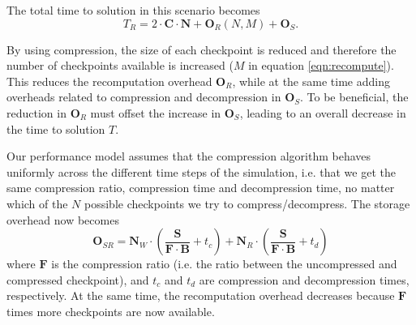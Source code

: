 \documentclass[conference]{IEEEtran}
\begin{document}
The total time to solution in this scenario becomes
\begin{equation}
T_R = 2 \cdot \mathbf{C} \cdot \mathbf{N} + \mathbf{O}_R(N, M) + \mathbf{O}_S.
\end{equation}

By using compression, the size of each checkpoint is reduced and therefore the
number of checkpoints available is increased ($M$ in equation
\ref{eqn:recompute}). This reduces the recomputation overhead $\mathbf{O}_R$,
while at the same time adding overheads related to compression and decompression
in $\mathbf{O}_S$.
To be beneficial, the reduction in $\mathbf{O}_R$ must offset the increase in 
$\mathbf{O}_S$, leading to an overall decrease in the time to solution $T$.

Our performance model assumes
 that the compression algorithm behaves uniformly
across the different time steps of the simulation, i.e. that we get the same compression ratio, compression time and 
decompression time, no matter which of the $N$ possible checkpoints we try to compress/decompress. The storage overhead
now becomes
\begin{equation}
\mathbf{O}_{SR} = \mathbf{N}_W \cdot \left(\frac{\mathbf{S}}{\mathbf{F}
  \cdot \mathbf{B}} + t_c\right) + \mathbf{N}_R \cdot
\left(\frac{\mathbf{S}}{\mathbf{F} \cdot \mathbf{B}} + t_d\right)
\end{equation}
where $\mathbf{F}$ is the compression ratio (i.e. the ratio between the uncompressed and compressed checkpoint), and $t_c$
and $t_d$ are compression and decompression times, respectively. At the same
time, the recomputation overhead decreases
because $\mathbf{F}$ times more checkpoints are now available.
\end{document}

